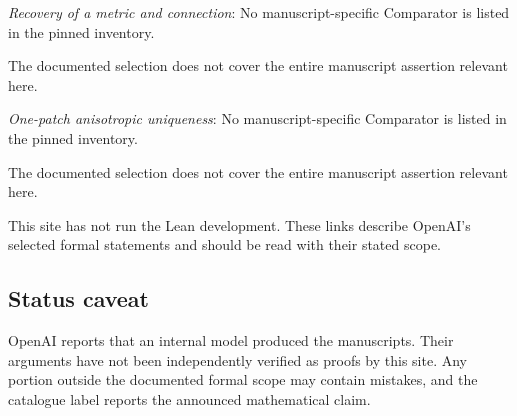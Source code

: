 \documentclass[11pt]{article}
\begin{document}
\textit{Recovery of a metric and connection}: No manuscript-specific Comparator is listed in the pinned inventory.

The documented selection does not cover the entire manuscript assertion relevant here.

\textit{One-patch anisotropic uniqueness}: No manuscript-specific Comparator is listed in the pinned inventory.

The documented selection does not cover the entire manuscript assertion relevant here.

This site has not run the Lean development. These links describe OpenAI’s selected formal statements and should be read with their stated scope.

\subsection{Status caveat}
OpenAI reports that an internal model produced the manuscripts. Their arguments have not been independently verified as proofs by this site. Any portion outside the documented formal scope may contain mistakes, and the catalogue label reports the announced mathematical claim.
\end{document}
